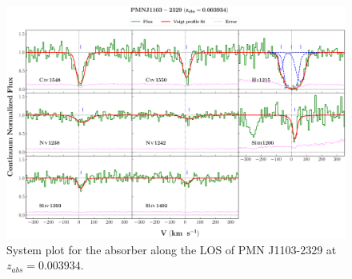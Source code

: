   
  \newpage
  \thispagestyle{empty}

  \begin{landscape}
  
  \begin{figure}
      \centering
      \vspace{-10mm}
      \hspace*{-20mm}
      \includegraphics[width=1.1\linewidth]{System-Plots/PMNJ1103-2329_z=0.003934_sys_plot.png}
      \caption{System plot for the absorber along the LOS of PMN J1103-2329 at $z_{abs} = 0.003934$. }
  \end{figure}
  
  \end{landscape}
  

